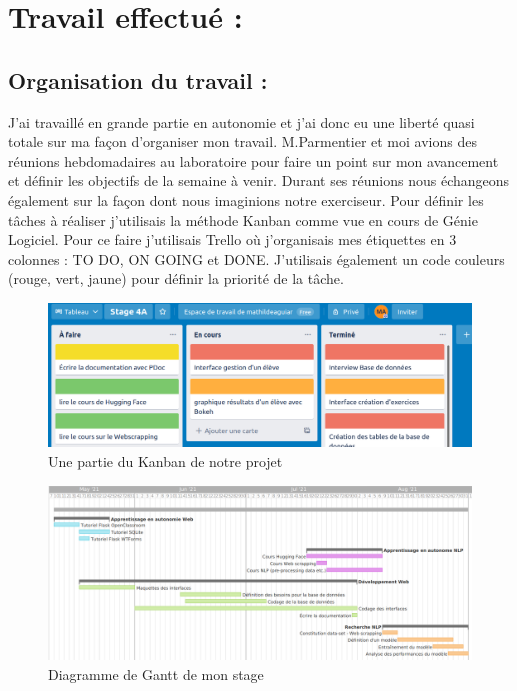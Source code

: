 \documentclass[12pt]{article}
\begin{document}
\section{Travail effectué :}
\subsection{Organisation du travail :}

J’ai travaillé en grande partie en autonomie et j’ai donc eu une liberté quasi totale sur ma façon d’organiser mon travail. M.Parmentier et moi avions des réunions hebdomadaires au laboratoire pour faire un point sur mon avancement et définir les objectifs de la semaine à venir. Durant ses réunions nous échangeons également sur la façon dont nous imaginions notre exerciseur. 
Pour définir les tâches à réaliser j’utilisais la méthode Kanban comme vue en cours de Génie Logiciel. Pour ce faire j’utilisais Trello où j’organisais mes étiquettes en 3 colonnes : TO DO, ON GOING et DONE. J’utilisais également un code couleurs (rouge, vert, jaune) pour définir la priorité de la tâche.  \\

\begin{figure}[h]
    \centering
    \includegraphics[scale=0.4]{trello.png}
    \caption{Une partie du Kanban de notre projet}
    \label{fig:trello}
\end{figure}

\begin{figure}
    \centering
    \includegraphics[scale=0.35]{gantt.png}
    \caption{Diagramme de Gantt de mon stage}
    \label{fig:gantt}
\end{figure}
\end{document}
